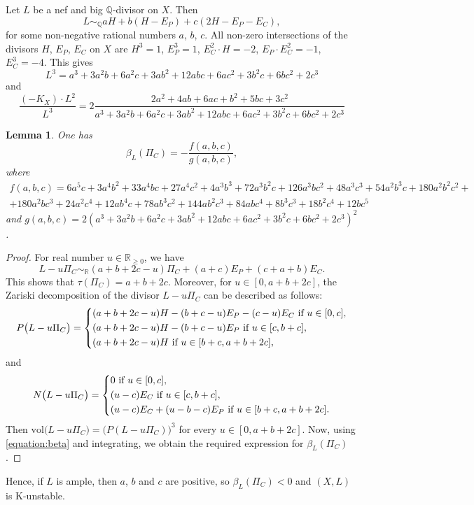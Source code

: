 \documentclass[12pt]{amsart}
\newtheorem{lemma}[theorem]{Lemma}
\theoremstyle{definition}
\theoremstyle{remark}
\begin{document}
Let $L$ be a nef and big $\mathbb{Q}$-divisor on $X$. Then
$$
L\sim_{\mathbb{Q}} aH+b(H-E_P)+c(2H-E_P-E_C),
$$
for some non-negative rational numbers $a$, $b$, $c$. All non-zero intersections of the divisors $H$, $E_P$, $E_C$ on $X$ are
$H^3=1$, $E_P^3=1$, $E_C^2\cdot H=-2$, $E_P\cdot E_C^2=-1$, $E_C^3=-4$. This gives
$$
L^3=a^3+3a^2b+6a^2c+3ab^2+12abc+6ac^2+3b^2c+6bc^2+2c^3
$$
and
$$
\frac{(-K_X)\cdot L^{2}}{L^3}=2\frac{2a^2+4ab+6ac+b^2+5bc+3c^2}{a^3+3a^2b+6a^2c+3ab^2+12abc+6ac^2+3b^2c+6bc^2+2c^3}
$$

\begin{lemma}
\label{lemma:3-23}
One has
$$
\beta_{L}(\Pi_C)=-\frac{f(a,b,c)}{g(a,b,c)},
$$
where
\begin{multline*}
f(a,b,c)=6a^5c+3a^4b^2+33a^4bc+27a^4c^2+4a^3b^3+72a^3b^2c+126a^3bc^2+48a^3c^3+54a^2b^3c+180a^2b^2c^2+\\
+180a^2bc^3+24a^2c^4+12ab^4c+78ab^3c^2+144ab^2c^3+84abc^4+8b^3c^3+18b^2c^4+12bc^5
\end{multline*}
and $g(a,b,c)=2(a^3+3a^2b+6a^2c+3ab^2+12abc+6ac^2+3b^2c+6bc^2+2c^3)^2$.
\end{lemma}

\begin{proof}
For real number $u\in\mathbb{R}_{\geqslant 0}$, we have
$$
L-u\Pi_C\sim_{\mathbb{R}}(a+b+2c-u)\Pi_C+(a+c)E_P+(c+a+b)E_C.
$$
This shows that $\tau(\Pi_C)=a+b+2c$. Moreover, for $u\in[0,a+b+2c]$, the Zariski decomposition of the divisor $L-u\Pi_C$ can be described as follows:
$$
P\big(L-u\Pi_C\big)=\left\{\aligned
&(a+b+2c-u)H-(b+c-u)E_P-(c-u)E_C\ \text{if $u\in[0,c]$},\\
&(a+b+2c-u)H-(b+c-u)E_P\ \text{if $u\in[c,b+c]$},\\
&(a+b+2c-u)H\ \text{if $u\in[b+c,a+b+2c]$},
\endaligned
\right.
$$
and
$$
N\big(L-u\Pi_C\big)=\left\{\aligned
&0\ \text{if $u\in[0,c]$},\\
&(u-c)E_C\ \text{if $u\in[c,b+c]$},\\
&(u-c)E_C+(u-b-c)E_P\ \text{if $u\in[b+c,a+b+2c]$}.\\
\endaligned
\right.
$$
Then $\mathrm{vol}\big(L-u\Pi_C\big)=\big(P(L-u\Pi_C)\big)^3$ for every $u\in[0,a+b+2c]$. Now, using \eqref{equation:beta} and integrating, we obtain the required expression for $\beta_L(\Pi_C)$.
\end{proof}

Hence, if $L$ is ample, then $a$, $b$ and $c$ are positive, so $\beta_L(\Pi_C)<0$ and $(X,L)$ is K-unstable.
\end{document}
